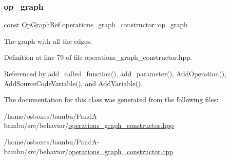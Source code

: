 \subsubsection{\texorpdfstring{op\+\_\+graph}{op\_graph}}
{\footnotesize\ttfamily const \hyperlink{op__graph_8hpp_aee97c95c40f791b60c451d9e29c72d39}{Op\+Graph\+Ref} operations\+\_\+graph\+\_\+constructor\+::op\+\_\+graph\hspace{0.3cm}{\ttfamily [private]}}



The graph with all the edges. 



Definition at line 79 of file operations\+\_\+graph\+\_\+constructor.\+hpp.



Referenced by add\+\_\+called\+\_\+function(), add\+\_\+parameter(), Add\+Operation(), Add\+Source\+Code\+Variable(), and Add\+Variable().



The documentation for this class was generated from the following files\+:\begin{DoxyCompactItemize}
\item 
/home/osboxes/bambu/\+Pand\+A-\/bambu/src/behavior/\hyperlink{operations__graph__constructor_8hpp}{operations\+\_\+graph\+\_\+constructor.\+hpp}\item 
/home/osboxes/bambu/\+Pand\+A-\/bambu/src/behavior/\hyperlink{operations__graph__constructor_8cpp}{operations\+\_\+graph\+\_\+constructor.\+cpp}\end{DoxyCompactItemize}
